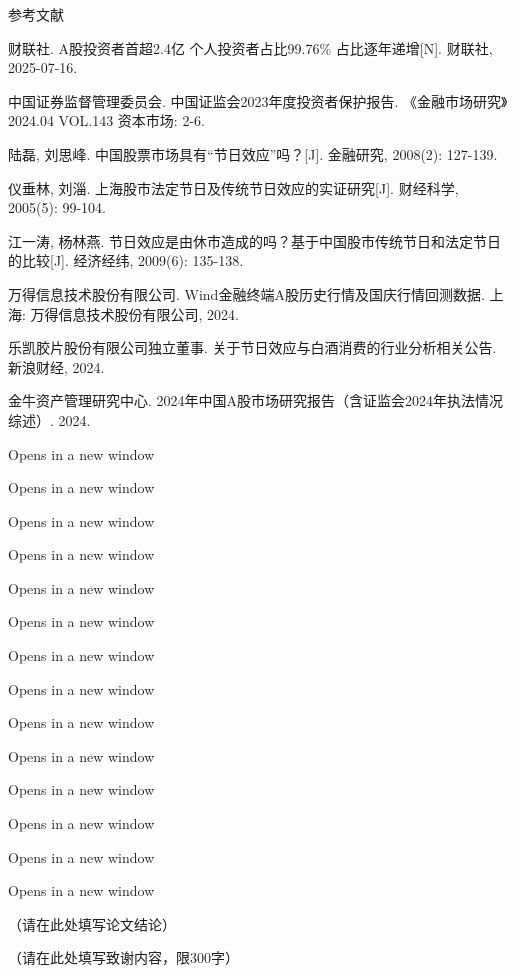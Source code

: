 \documentclass{cupb-thesis}
\begin{document}
参考文献

财联社. A股投资者首超2.4亿 个人投资者占比99.76\% 占比逐年递增[N]. 财联社, 2025-07-16.

中国证券监督管理委员会. 中国证监会2023年度投资者保护报告. 《金融市场研究》2024.04 VOL.143 资本市场: 2-6.

陆磊, 刘思峰. 中国股票市场具有“节日效应”吗？[J]. 金融研究, 2008(2): 127-139.

仪垂林, 刘淄. 上海股市法定节日及传统节日效应的实证研究[J]. 财经科学, 2005(5): 99-104.

江一涛, 杨林燕. 节日效应是由休市造成的吗？基于中国股市传统节日和法定节日的比较[J]. 经济经纬, 2009(6): 135-138.

万得信息技术股份有限公司. Wind金融终端A股历史行情及国庆行情回测数据. 上海: 万得信息技术股份有限公司, 2024.

乐凯胶片股份有限公司独立董事. 关于节日效应与白酒消费的行业分析相关公告. 新浪财经, 2024.

金牛资产管理研究中心. 2024年中国A股市场研究报告（含证监会2024年执法情况综述）. 2024.


Opens in a new window

Opens in a new window

Opens in a new window

Opens in a new window

Opens in a new window

Opens in a new window

Opens in a new window

Opens in a new window

Opens in a new window

Opens in a new window

Opens in a new window

Opens in a new window

Opens in a new window

Opens in a new window



\begin{conclusion}
（请在此处填写论文结论）
\end{conclusion}




\begin{acknowledgement}
（请在此处填写致谢内容，限300字）
\end{acknowledgement}
\end{document}
